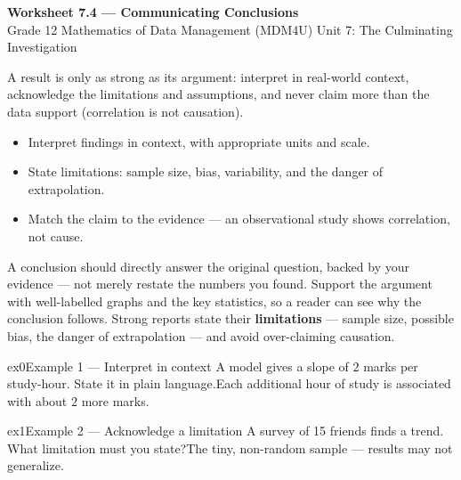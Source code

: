 \documentclass[11pt]{article}
\begin{document}
\begin{center}
{\LARGE\bfseries\color{titleblue}Worksheet 7.4 --- Communicating Conclusions}\\[2pt]
{\small Grade 12 Mathematics of Data Management (MDM4U) \textperiodcentered{} Unit 7: The Culminating Investigation}
\end{center}

\begin{ideabox}
A result is only as strong as its argument: interpret in real-world context, acknowledge the limitations and assumptions, and never claim more than the data support (correlation is not causation).
\begin{itemize}[leftmargin=*,itemsep=2pt]
  \item Interpret findings in context, with appropriate units and scale.
  \item State limitations: sample size, bias, variability, and the danger of extrapolation.
  \item Match the claim to the evidence --- an observational study shows correlation, not cause.
\end{itemize}
\end{ideabox}

\begin{learnbox}
A conclusion should directly answer the original question, backed by your evidence — not merely restate the numbers you found.
Support the argument with well-labelled graphs and the key statistics, so a reader can see why the conclusion follows.
Strong reports state their \textbf{limitations} — sample size, possible bias, the danger of extrapolation — and avoid over-claiming causation.
\end{learnbox}


\begin{example}{ex0}{Example 1 --- Interpret in context}
A model gives a slope of $2$ marks per study-hour. State it in plain language.\soln Each additional hour of study is associated with about $2$ more marks.
\end{example}

\begin{example}{ex1}{Example 2 --- Acknowledge a limitation}
A survey of 15 friends finds a trend. What limitation must you state?\soln The tiny, non-random sample --- results may not generalize.
\end{example}
\end{document}
